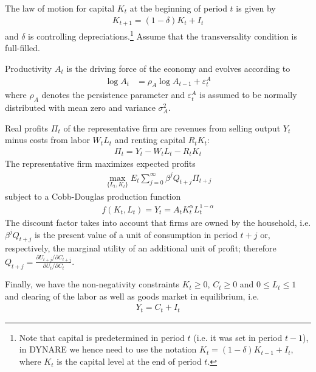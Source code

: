 \documentclass[a4paper]{scrartcl}
\begin{document}
    The law of motion for capital $K_t$ at the beginning of period $t$ is given by
    \begin{align*}
        K_{t+1} = (1-\delta)K_t + I_t
    \end{align*}
    and $\delta$ is controlling depreciations.\footnote{Note that capital is predetermined in period $t$ (i.e. it was set in period $t-1$), in DYNARE we hence need to use the notation $K_t = (1-\delta)K_{t-1} + I_t$, where $K_t$ is the capital level at the end of period $t$.} Assume that the transversality condition is full-filled.
    
    Productivity $A_t$ is the driving force of the economy and evolves according to
    \begin{align*}
        \log{A_{t}} & = \rho_A \log{A_{t-1}}  + \varepsilon_t^A
    \end{align*}
    where $\rho_A$ denotes the persistence parameter and $\varepsilon_t^A$ is assumed to be normally distributed with mean zero and variance $\sigma_A^2$.
    
    Real profits $\Pi_t$ of the representative firm are revenues from selling output $Y_t$ minus costs from labor $W_t L_t$ and renting capital $R_t K_t$:
    \begin{align*}
        \Pi_t = Y_{t} - W_{t} L_{t} - R_{t} K_{t}
    \end{align*}
    The representative firm maximizes expected profits
    \begin{align*}
        \underset{\{L_{t},K_{t}\}}{\max} E_t \sum_{j=0}^{\infty} \beta^j Q_{t+j}\Pi_{t+j}
    \end{align*}
    subject to a Cobb-Douglas production function
    \begin{align*}
        f(K_t, L_t) = Y_t = A_t K_t^\alpha L_t^{1-\alpha}
    \end{align*}
    The discount factor takes into account that firms are owned by the household, i.e. $\beta^j Q_{t+j}$ is the present value of a unit of consumption in period $t+j$ or, respectively, the marginal utility of an additional unit of profit; therefore $Q_{t+j}=\frac{\partial U_{t+j}/\partial C_{t+j}}{\partial U_{t}/\partial C_{t}}$.
    
    Finally, we have the non-negativity constraints	$K_t \geq0$, $C_t \geq 0$ and $0\leq L_t \leq 1$ and clearing of the labor as well as goods market in equilibrium, i.e.
    \begin{align*}
        Y_t = C_t + I_t
    \end{align*}
    
\end{document}
